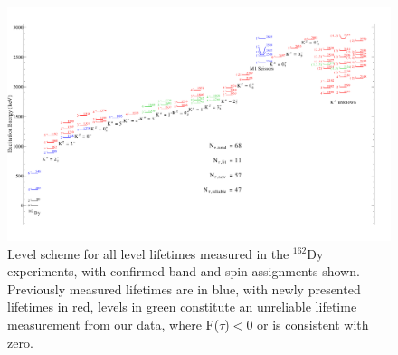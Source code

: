 \begin{landscape}
\begin{figure}[h!]
\begin{center}
\includegraphics[height=0.8\textheight]{figures/162Dy_All.pdf}
\caption{Level scheme for all level lifetimes measured in the $^{162}$Dy experiments, with confirmed band and spin assignments shown. Previously measured lifetimes are in blue, with newly presented lifetimes in red, levels in green constitute an unreliable lifetime measurement from our data, where F($\tau$)$<$0 or is consistent with zero. 
\label{fig:162Dy_All}}
\end{center}
\end{figure}

\end{landscape}


